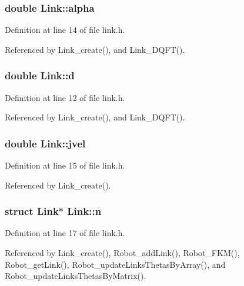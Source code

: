 \hypertarget{structLink_ab838e5bc121c212cb1a81fdf78de8757}{
\subsubsection[{alpha}]{\setlength{\rightskip}{0pt plus 5cm}double Link\-::alpha}}\label{structLink_ab838e5bc121c212cb1a81fdf78de8757}


Definition at line 14 of file link.\-h.



Referenced by Link\-\_\-create(), and Link\-\_\-\-D\-Q\-F\-T().

\hypertarget{structLink_a4e5e4ea2ef9be2aae1e9fdef406be185}{
\subsubsection[{d}]{\setlength{\rightskip}{0pt plus 5cm}double Link\-::d}}\label{structLink_a4e5e4ea2ef9be2aae1e9fdef406be185}


Definition at line 12 of file link.\-h.



Referenced by Link\-\_\-create(), and Link\-\_\-\-D\-Q\-F\-T().

\hypertarget{structLink_a9ba28f0b8b867ad4624abb9730ef30d2}{
\subsubsection[{jvel}]{\setlength{\rightskip}{0pt plus 5cm}double Link\-::jvel}}\label{structLink_a9ba28f0b8b867ad4624abb9730ef30d2}


Definition at line 15 of file link.\-h.



Referenced by Link\-\_\-create().

\hypertarget{structLink_a185503cf680f8e9395c19c0521997c5c}{
\subsubsection[{n}]{\setlength{\rightskip}{0pt plus 5cm}struct {\bf Link}$\ast$ Link\-::n}}\label{structLink_a185503cf680f8e9395c19c0521997c5c}


Definition at line 17 of file link.\-h.



Referenced by Link\-\_\-create(), Robot\-\_\-add\-Link(), Robot\-\_\-\-F\-K\-M(), Robot\-\_\-get\-Link(), Robot\-\_\-update\-Links\-Thetas\-By\-Array(), and Robot\-\_\-update\-Links\-Thetas\-By\-Matrix().

